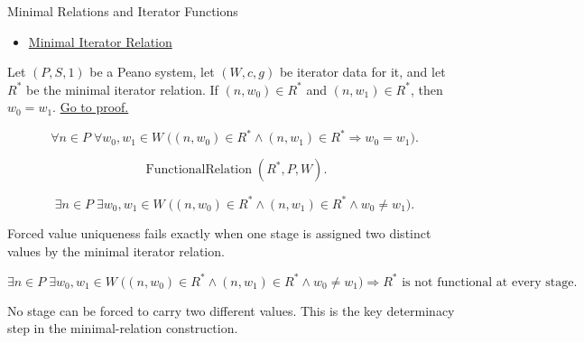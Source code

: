 \begin{topicbox}{Minimal Relations and Iterator Functions}
\begin{remark*}[Dependencies]
\begin{itemize}
  \item \hyperref[def:minimal-iterator-relation]{Minimal Iterator Relation}
\end{itemize}
\end{remark*}

\begin{tcolorbox}[colback=lembox, colframe=lemborder, arc=2pt,
  left=6pt, right=6pt, top=4pt, bottom=4pt,
  title={\small\textbf{Lemma (Forced Values Are Unique)}},
  fonttitle=\small\bfseries]
\begin{lemma}
\label{lem:forced-values-are-unique}
Let $(P,S,1)$ be a Peano system, let $(W,c,g)$ be iterator data for it, and let
$R^*$ be the minimal iterator relation. If $(n,w_0)\in R^*$ and
$(n,w_1)\in R^*$, then $w_0=w_1$.
\hyperref[prf:forced-values-are-unique]{Go to proof.}
\end{lemma}
\end{tcolorbox}

\begin{remark*}
\[
\forall n\in P\;\forall w_0,w_1\in W\;
\bigl((n,w_0)\in R^*\land (n,w_1)\in R^*\Longrightarrow w_0=w_1\bigr).
\]
\end{remark*}

\begin{remark*}
\[
\operatorname{FunctionalRelation}(R^*,P,W).
\]
\end{remark*}

\begin{remark*}
\[
\exists n\in P\;\exists w_0,w_1\in W\;
\bigl((n,w_0)\in R^*\land (n,w_1)\in R^*\land w_0\neq w_1\bigr).
\]
\end{remark*}

\begin{remark*}
Forced value uniqueness fails exactly when one stage is assigned two distinct
values by the minimal iterator relation.
\end{remark*}

\begin{remark*}
\[
\exists n\in P\;\exists w_0,w_1\in W\;
\bigl((n,w_0)\in R^*\land (n,w_1)\in R^*\land w_0\neq w_1\bigr)
\Longrightarrow
R^* \text{ is not functional at every stage}.
\]
\end{remark*}

\begin{remark*}[Interpretation]
No stage can be forced to carry two different values. This is the key
determinacy step in the minimal-relation construction.
\end{remark*}


\end{topicbox}
